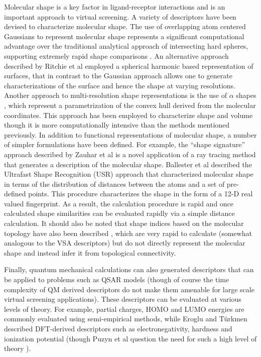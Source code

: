 \documentclass[letterpaper, 12pt]{article}
\begin{document}
Molecular shape is a key factor in ligand-receptor interactions and is
an important approach to virtual screening. A variety of descriptors
have been devised to characterize molecular shape. The use of
overlapping atom centered Gaussians to represent molecular shape
\cite{Grant:1995aa} represents a significant computational advantage
over the traditional analytical approach of intersecting hard spheres,
supporting extremely rapid shape comparisons \cite{Grant:1999vn}. An
alternative approach described by Ritchie et al \cite{Ritchie:1999kx}
employed a spherical harmonic based representation of surfaces, that
in contrast to the Gaussian approach allows one to generate
characterizations of the surface and hence the shape at varying
resolutions. Another approach to multi-resolution shape
representations is the use of $\alpha$ shapes
\cite{Edelsbrunner:1994aa}, which represent a parametrization of the
convex hull derived from the molecular coordinates. This approach has
been employed to characterize shape and volume \cite{Wilson:2009ys}
though it is more computationally intensive than the methods mentioned
previously. In addition to functional representations of molecular
shape, a number of simpler formulations have been defined. For
example, the ``shape signature'' approach described by Zauhar et al
\cite{Zauhar:2003fk} is a novel application of a ray tracing method
that generates a description of the molecular shape. Ballester et al
\cite{Ballester:2007aa} described the Ultrafast Shape Recognition
(USR) approach that characterized molecular shape in terms of the
distribution of distances between the atoms and a set of pre-defined
points. This procedure characterizes the shape in the form of a 12-D
real valued fingerprint. As a result, the calculation procedure is
rapid and once calculated shape similarities can be evaluated rapidly
via a simple distance calculation. It should also be noted that shape
indices based on the molecular topology have also been described
\cite{Kier:1985aa}, which are very rapid to calculate (somewhat
analogous to the VSA descriptors) but do not directly represent the
molecular shape and instead infer it from topological connectivity.

Finally, quantum mechanical calculations can also generated
descriptors that can be applied to problems such as QSAR models
(though of course the time complexity of QM derived descriptors do not
make them amenable for large scale virtual screening
applications). These descriptors can be evaluated at various levels of
theory. For example, partial charges, HOMO and LUMO energies are
commonly evaluated using semi-empirical methods, while Eroglu and
T\"{u}rkmen \cite{Eroglu:2007uq} described DFT-derived descriptors
such as electronegativity, hardness and ionization potential (though
Puzyn et al question the need for such a high level of theory
\cite{Puzyn:2008fk}).
\end{document}
